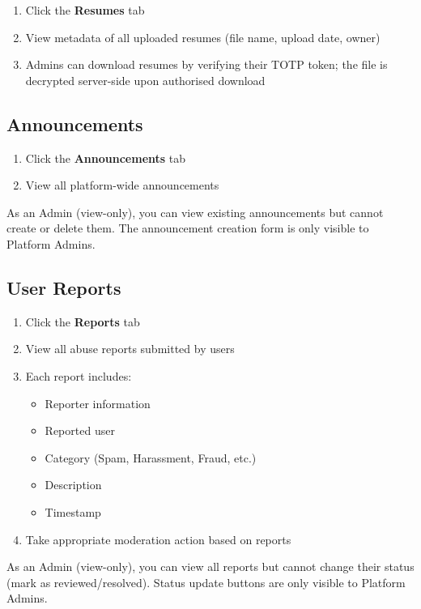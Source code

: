 \documentclass[12pt,a4paper]{article}
\begin{document}
\begin{enumerate}
  \item Click the \textbf{Resumes} tab
  \item View metadata of all uploaded resumes (file name, upload date, owner)
  \item Admins can download resumes by verifying their TOTP token; the file is decrypted server-side upon authorised download
\end{enumerate}

\subsection{Announcements}

\begin{enumerate}
  \item Click the \textbf{Announcements} tab
  \item View all platform-wide announcements
\end{enumerate}

\begin{infobox}
As an Admin (view-only), you can view existing announcements but cannot create or delete them. The announcement creation form is only visible to Platform Admins.
\end{infobox}

\subsection{User Reports}

\begin{enumerate}
  \item Click the \textbf{Reports} tab
  \item View all abuse reports submitted by users
  \item Each report includes:
    \begin{itemize}
      \item Reporter information
      \item Reported user
      \item Category (Spam, Harassment, Fraud, etc.)
      \item Description
      \item Timestamp
    \end{itemize}
  \item Take appropriate moderation action based on reports
\end{enumerate}

\begin{infobox}
As an Admin (view-only), you can view all reports but cannot change their status (mark as reviewed/resolved). Status update buttons are only visible to Platform Admins.
\end{infobox}
\end{document}
